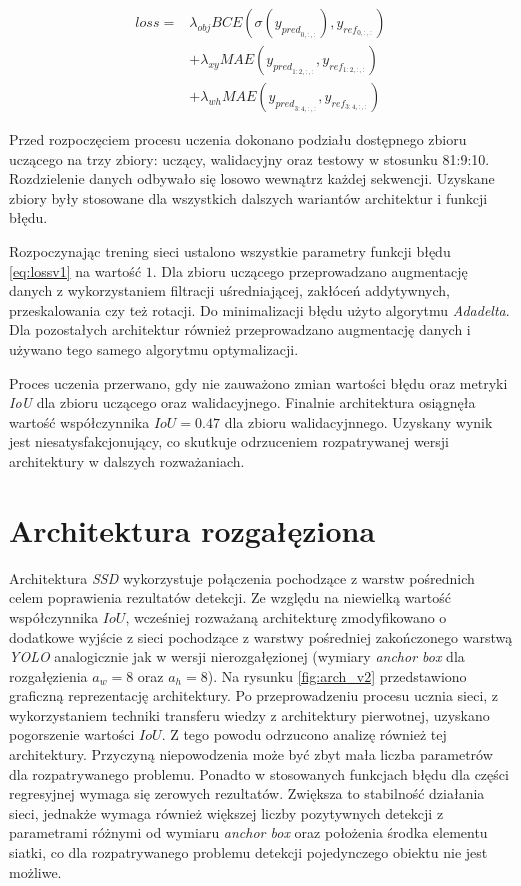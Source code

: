 \begin{equation}
\begin{aligned}
loss =& \lambda_{obj} BCE(\sigma(y_{pred}_{0,:,:}), y_{ref}_{0,:,:}) \\
&+ \lambda_{xy}MAE(y_{pred}_{1:2,:,:}, y_{ref}_{1:2,:,:})\\
&+ \lambda_{wh}MAE(y_{pred}_{3:4,:,:},y_{ref}_{3:4,:,:}) 
\end{aligned}
\label{eq:lossv1}
\end{equation}


Przed rozpoczęciem procesu uczenia dokonano podziału dostępnego zbioru uczącego na trzy zbiory: uczący, walidacyjny oraz testowy w stosunku 81:9:10. 
Rozdzielenie danych odbywało się losowo wewnątrz każdej sekwencji.
Uzyskane zbiory były stosowane dla wszystkich dalszych wariantów architektur i funkcji błędu.

Rozpoczynając trening sieci ustalono wszystkie parametry funkcji błędu \eqref{eq:lossv1} na wartość $1$.
Dla zbioru uczącego przeprowadzano augmentację danych z wykorzystaniem filtracji uśredniającej, zakłóceń addytywnych, przeskalowania czy też rotacji.
Do minimalizacji błędu użyto algorytmu \emph{Adadelta}.
Dla pozostałych architektur również przeprowadzano augmentację danych i używano tego samego algorytmu optymalizacji.

Proces uczenia przerwano, gdy nie zauważono zmian wartości błędu oraz metryki \emph{IoU} dla zbioru uczącego oraz walidacyjnego.
Finalnie architektura osiągnęła wartość współczynnika $IoU = 0.47$ dla zbioru walidacyjnnego.
Uzyskany wynik jest niesatysfakcjonujący, co skutkuje odrzuceniem rozpatrywanej wersji architektury w dalszych rozważaniach.

\section{Architektura rozgałęziona}

Architektura \emph{SSD} wykorzystuje połączenia pochodzące z warstw pośrednich celem poprawienia rezultatów detekcji.  
Ze względu na niewielką wartość współczynnika $IoU$, wcześniej rozważaną architekturę zmodyfikowano o  dodatkowe wyjście z sieci pochodzące z warstwy pośredniej zakończonego warstwą \emph{YOLO} analogicznie jak w wersji nierozgałęzionej (wymiary \emph{anchor box} dla rozgałęzienia $a_w = 8$ oraz  $a_h = 8$). 
Na rysunku \ref{fig:arch_v2} przedstawiono graficzną reprezentację architektury. 
Po przeprowadzeniu procesu ucznia sieci, z wykorzystaniem techniki transferu wiedzy z architektury pierwotnej, uzyskano pogorszenie wartości $IoU$.
Z tego powodu odrzucono analizę również tej architektury.
Przyczyną niepowodzenia może być zbyt mała liczba parametrów dla rozpatrywanego problemu.
Ponadto w stosowanych funkcjach błędu dla części regresyjnej wymaga się zerowych rezultatów.
Zwiększa to stabilność działania sieci, jednakże wymaga również większej liczby pozytywnych detekcji z parametrami różnymi od wymiaru \emph{anchor box} oraz położenia środka elementu siatki, co dla rozpatrywanego problemu detekcji pojedynczego obiektu nie jest możliwe. 

